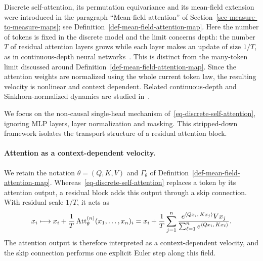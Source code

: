 Discrete self-attention, its permutation equivariance and its mean-field extension were introduced in the paragraph ``Mean-field attention'' of Section~\ref{sec-measure-to-measure-maps}; see Definition~\ref{def-mean-field-attention-map}. Here the number of tokens is fixed in the discrete model and the limit concerns depth: the number \(T\) of residual attention layers grows while each layer makes an update of size \(1/T\), as in continuous-depth neural networks~\cite{Chen2018NeuralODE}. This is distinct from the many-token limit discussed around Definition~\ref{def-mean-field-attention-map}. Since the attention weights are normalized using the whole current token law, the resulting velocity is nonlinear and context dependent. Related continuous-depth and Sinkhorn-normalized dynamics are studied in~\cite{Sander2022Sinkformers,Castin2025DynamicsTransformers}.

We focus on the non-causal single-head mechanism of~\eqref{eq-discrete-self-attention}, ignoring MLP layers, layer normalization and masking. This stripped-down framework isolates the transport structure of a residual attention block.

\paragraph{Attention as a context-dependent velocity.}

We retain the notation \(\theta=(Q,K,V)\) and \(\Gamma_\theta\) of Definition~\ref{def-mean-field-attention-map}. Whereas~\eqref{eq-discrete-self-attention} replaces a token by its attention output, a residual block adds this output through a skip connection. With residual scale \(1/T\), it acts as
\begin{equation}\label{eq-transformer-residual-attention-step}
	x_i
	\longmapsto
	x_i+\frac1T\operatorname{Att}^{(n)}_\theta(x_1,\ldots,x_n)_i
	=
	x_i+\frac1T
	\sum_{j=1}^n
	\frac{e^{\langle Qx_i,\,Kx_j\rangle}Vx_j}
	{\sum_{\ell=1}^n e^{\langle Qx_i,\,Kx_\ell\rangle}}.
\end{equation}
The attention output is therefore interpreted as a context-dependent velocity, and the skip connection performs one explicit Euler step along this field.

